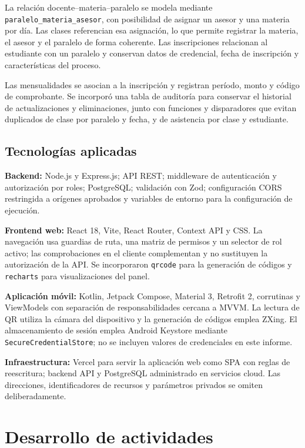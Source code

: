 \documentclass[12pt,a4paper,oneside]{report}
\begin{document}
La relación docente--materia--paralelo se modela mediante \texttt{paralelo\_materia\_asesor}, con posibilidad de asignar un asesor y una materia por día. Las clases referencian esa asignación, lo que permite registrar la materia, el asesor y el paralelo de forma coherente. Las inscripciones relacionan al estudiante con un paralelo y conservan datos de credencial, fecha de inscripción y características del proceso.

Las mensualidades se asocian a la inscripción y registran período, monto y código de comprobante. Se incorporó una tabla de auditoría para conservar el historial de actualizaciones y eliminaciones, junto con funciones y disparadores que evitan duplicados de clase por paralelo y fecha, y de asistencia por clase y estudiante.

\section{Tecnologías aplicadas}

\textbf{Backend:} Node.js y Express.js; API REST; middleware de autenticación y autorización por roles; PostgreSQL; validación con Zod; configuración CORS restringida a orígenes aprobados y variables de entorno para la configuración de ejecución.

\textbf{Frontend web:} React 18, Vite, React Router, Context API y CSS. La navegación usa guardias de ruta, una matriz de permisos y un selector de rol activo; las comprobaciones en el cliente complementan y no sustituyen la autorización de la API. Se incorporaron \texttt{qrcode} para la generación de códigos y \texttt{recharts} para visualizaciones del panel.

\textbf{Aplicación móvil:} Kotlin, Jetpack Compose, Material 3, Retrofit 2, corrutinas y ViewModels con separación de responsabilidades cercana a MVVM. La lectura de QR utiliza la cámara del dispositivo y la generación de códigos emplea ZXing. El almacenamiento de sesión emplea Android Keystore mediante \texttt{SecureCredentialStore}; no se incluyen valores de credenciales en este informe.

\textbf{Infraestructura:} Vercel para servir la aplicación web como SPA con reglas de reescritura; backend API y PostgreSQL administrado en servicios cloud. Las direcciones, identificadores de recursos y parámetros privados se omiten deliberadamente.

\chapter{Desarrollo de actividades}
\end{document}
